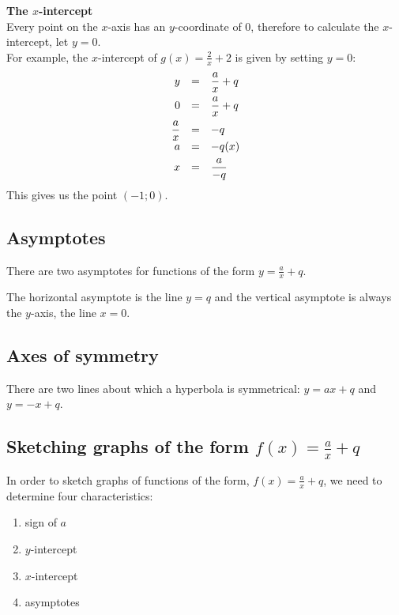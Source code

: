 \textbf{The $x$-intercept} \\
Every point on the $x$-axis has an $y$-coordinate of $0$, therefore to calculate the $x$-intercept, let $y=0$.\\
For example, the $x$-intercept of $g(x)=\frac{2}{x}+2$ is given by setting $y=0$:
\begin{equation*}
\begin{array}{ccl}
\hfill y& =& \dfrac{a}{x}+q\hfill \vspace{4pt}\\
 \hfill 0& =& \dfrac{a}{x}+q\hfill \vspace{4pt} \\
 \hfill \dfrac{a}{x}& =& -q\hfill \\
 \hfill a& =& -q(x)\hfill \vspace{4pt}\\
 \hfill x& =& \dfrac{a}{-q}\hfill 
\end{array}
\end{equation*}
This gives us the point $(-1; 0)$.


\subsection*{Asymptotes}

There are two asymptotes for functions of the form $y=\frac{a}{x}+q$. \par 
The horizontal asymptote is the line $y=q$ and the vertical asymptote is always the $y$-axis, the line $x=0$. 

\subsection*{Axes of symmetry}
There are two lines about which a hyperbola is symmetrical: $y=ax+q$ and $y = -x +q$.


\subsection*{Sketching graphs of the form $f(x)=\frac{a}{x}+q$}

In order to sketch graphs of functions of the form, $f(x)=\frac{a}{x}+q$, we need to determine four characteristics:
\begin{enumerate}[noitemsep, label=\textbf{\arabic*}. ] 
\item sign of $a$
\item $y$-intercept
\item $x$-intercept
\item asymptotes
\end{enumerate}


